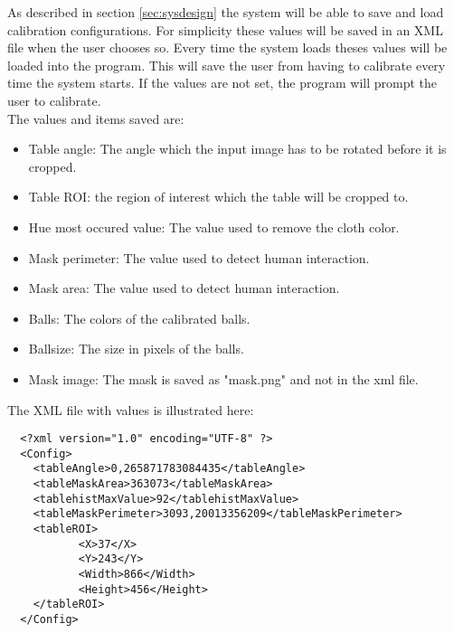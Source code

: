 As described in section \ref{sec:sysdesign} the system will be able to save and load calibration configurations. For simplicity these values will be saved in an XML file when the user chooses so. Every time the system loads theses values will be loaded into the program. This will save the user from having to calibrate every time the system starts. If the values are not set, the program will prompt the user to calibrate.\\

The values and items saved are:
\begin{itemize}
	\item Table angle: The angle which the input image has to be rotated before it is cropped.
	\item Table ROI: the region of interest which the table will be cropped to.
	\item Hue most occured value: The value used to remove the cloth color.
	\item Mask perimeter: The value used to detect human interaction.
	\item Mask area: The value used to detect human interaction.
	\item Balls: The colors of the calibrated balls.
	\item Ballsize: The size in pixels of the balls.
	\item Mask image: The mask is saved as "mask.png" and not in the xml file.
\end{itemize}

The XML file with values is illustrated here:

\lstset{language=XML}
\begin{lstlisting}
  <?xml version="1.0" encoding="UTF-8" ?> 
  <Config>
  	<tableAngle>0,265871783084435</tableAngle> 
  	<tableMaskArea>363073</tableMaskArea> 
  	<tablehistMaxValue>92</tablehistMaxValue> 
  	<tableMaskPerimeter>3093,20013356209</tableMaskPerimeter> 
  	<tableROI>
		   <X>37</X> 
		   <Y>243</Y> 
		   <Width>866</Width> 
		   <Height>456</Height> 
    </tableROI>
  </Config>
\end{lstlisting}

